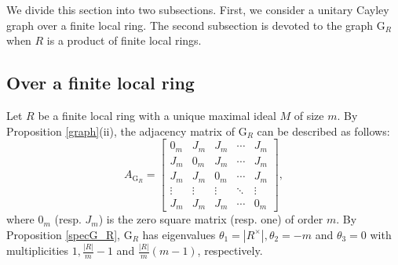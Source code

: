 \documentclass[12pt]{amsart}
\numberwithin{equation}{section}
\theoremstyle{definition}
\theoremstyle{definition} \numberwithin{equation}{section}
\newcommand{\G}{\mathrm{G}}
\begin{document}
We divide this section into two subsections. First, we consider a unitary Cayley graph over a finite local ring. The second subsection is devoted to the graph $\G_R$ when $R$ is a product of finite local rings.  

\subsection{Over a finite local ring} 

Let $R$ be a finite local ring with a unique maximal ideal $M$ of size $m$.
By Proposition \ref{graph}(ii), the adjacency matrix of $\G_R$ can be described as follows:
\begin{equation*}
    A_{\G_R}=
            \left [
            \begin{array}{ccccc}
               0_{m}  & J_{m} & J_{m} & \cdots & J_{m} \\
               J_{m}  & 0_{m} & J_{m} & \cdots & J_{m} \\
              J_{m}  & J_{m} & 0_{m} & \cdots & J_{m} \\
              \vdots & \vdots & \vdots & \ddots & \vdots \\
              J_{m}  & J_{m} & J_{m} & \cdots & 0_{m}
            \end{array}
            \right ]  ,   
\end{equation*}
where $0_m$ (resp. $J_m$) is the zero square matrix (resp. one) of order $m$.
By Proposition \ref{specG_R},  $\G_R$ has eigenvalues $\theta_1 = |R^\times|, \theta_2 = -m$ and $\theta_3 = 0$ with multiplicities $1,\frac{|R|}{m}-1$ and $\frac{|R|}{m}(m-1)$, respectively.
\end{document}
